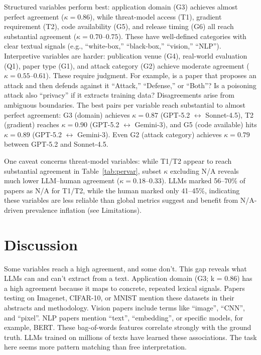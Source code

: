 \documentclass[conference,compsoc]{IEEEtran}
\begin{document}
Structured variables perform best: application domain (G3) achieves almost perfect agreement ($\kappa = 0.86$), while threat-model access (T1), gradient requirement (T2), code availability (G5), and release timing (G6) all reach substantial agreement ($\kappa = 0.70$--$0.75$). These have well-defined categories with clear textual signals (e.g., ``white-box,'' ``black-box,'' ``vision,'' ``NLP''). Interpretive variables are harder: publication venue (G4), real-world evaluation (Q1), paper type (G1), and attack category (G2) achieve moderate agreement ($\kappa = 0.55$--$0.61$). These require judgment. For example, is a paper that proposes an attack and then defends against it ``Attack,'' ``Defense,'' or ``Both''? Is a poisoning attack also ``privacy'' if it extracts training data? Disagreements arise from ambiguous boundaries. The best pairs per variable reach substantial to almost perfect agreement: G3 (domain) achieves $\kappa = 0.87$ (GPT-5.2 $\leftrightarrow$ Sonnet-4.5), T2 (gradient) reaches $\kappa = 0.90$ (GPT-5.2 $\leftrightarrow$ Gemini-3), and G5 (code available) hits $\kappa = 0.89$ (GPT-5.2 $\leftrightarrow$ Gemini-3). Even G2 (attack category) achieves $\kappa = 0.79$ between GPT-5.2 and Sonnet-4.5.

One caveat concerns threat-model variables: while T1/T2 appear to reach substantial agreement in Table~\ref{tab:pervar}, subset $\kappa$ excluding N/A reveals much lower LLM--human agreement ($\kappa = 0.18$--$0.33$). LLMs marked 56--70\% of papers as N/A for T1/T2, while the human marked only 41--45\%, indicating these variables are less reliable than global metrics suggest and benefit from N/A-driven prevalence inflation (see Limitations).

\section{Discussion}

Some variables reach a high agreement, and some don't. This gap reveals what LLMs can and can't extract from a text. Application domain (G3; k = 0.86) has a high agreement because it maps to concrete, repeated lexical signals. Papers testing on Imagenet, CIFAR-10, or MNIST mention these datasets in their abstracts and methodology. Vision papers include terms like ``image'', ``CNN'', and ``pixel''. NLP papers mention ``text'', ``embedding'', or specific models, for example, BERT. These bag-of-words features correlate strongly with the ground truth. LLMs trained on millions of texts have learned these associations. The task here seems more pattern matching than free interpretation.
\end{document}
